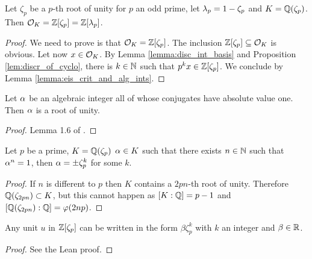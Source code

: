 \begin{theorem}\label{theorem:ring_of_ints_of_cyclo}
	\leanok
	Let $\zeta_p$ be a $p$-th root of unity for $p$ an odd prime, let $\lambda_p=1-\zeta_p$ and $K=\mathbb{Q}(\zeta_p)$. Then $\mathcal{O}_K=\mathbb{Z}[\zeta_p]=\mathbb{Z}[\lambda_p]$.
\end{theorem}
\begin{proof}
    \leanok
    We need to prove is that $\mathcal{O}_K=\mathbb{Z}[\zeta_p]$. The inclusion $\mathbb{Z}[\zeta_p] \subseteq \mathcal{O}_K$ is obvious. Let now $x \in \mathcal{O}_K$. By Lemma \ref{lemma:disc_int_basis} and Proposition \ref{lem:discr_of_cyclo}, there is $k \in \mathbb{N}$ such that $p^k x \in \mathbb{Z}[\zeta_p]$. We conclude by Lemma \ref{lemma:eis_crit_and_alg_ints}.
\end{proof}

\begin{lemma}\label{lemma:alg_int_abs_val_one}
    \leanok
	Let $\alpha$ be an algebraic integer all of whose conjugates have absolute value one. Then $\alpha$ is a root of unity.
\end{lemma}
\begin{proof}
	\leanok
	Lemma 1.6 of \cite{washington}.
\end{proof}


\begin{lemma}\label{lem:roots_of_unity_in_cyclo}
	\leanok
	Let $p$ be a prime, $K=\mathbb{Q}(\zeta_p)$ $\alpha \in K$ such that there exists $n \in \mathbb{N}$ such that $\alpha^n=1$, then $\alpha =\pm \zeta_p^k$ for some $k$.
\end{lemma}
\begin{proof}
	\leanok
	If $n$ is different to $p$ then $K$ contains a $2pn$-th root of unity. Therefore $\mathbb{Q}(\zeta_{2pn}) \subset K$, but this cannot happen as $[K : \mathbb{Q}]=p-1$ and $[\mathbb{Q}(\zeta_{2pn}): \mathbb{Q} ] = \varphi(2np)$.
\end{proof}

\begin{lemma}\label{lemma:unit_lemma}
	\leanok
	Any unit $u$ in $\mathbb{Z}[\zeta_p]$ can be written in the form $\beta \zeta_p^k  $ with $k$ an integer and $\beta \in \mathbb{R}$.
\end{lemma}
\begin{proof}
	\leanok
	See the Lean proof.
\end{proof}

